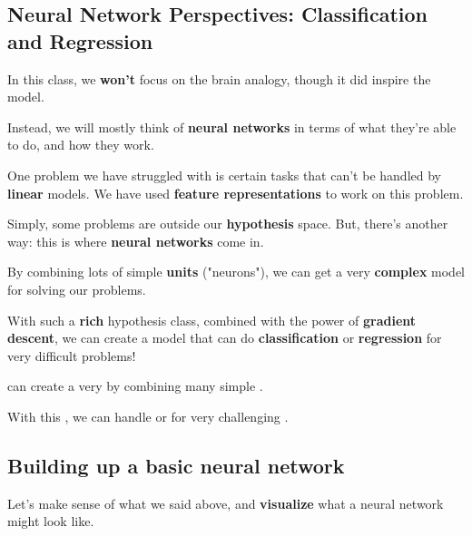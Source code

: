     \subsection*{Neural Network Perspectives: Classification and Regression}
    
        In this class, we \textbf{won't} focus on the brain analogy, though it did inspire the model.
        
        Instead, we will mostly think of \textbf{neural networks} in terms of what they're able to do, and how they work.
        
        One problem we have struggled with is certain tasks that can't be handled by \textbf{linear} models. We have used \textbf{feature representations} to work on this problem.
        
        Simply, some problems are outside our \textbf{hypothesis} space. But, there's another way: this is where \textbf{neural networks} come in.
        
        By combining lots of simple \textbf{units} ("neurons"), we can get a very \textbf{complex} model for solving our problems.
        
        With such a \textbf{rich} hypothesis class, combined with the power of \textbf{gradient descent}, we can create a model that can do \textbf{classification} or \textbf{regression} for very difficult problems!
            \\
            
        \begin{concept}
             can create a very  by combining many simple .
            
            With this , we can handle  or  for very challenging .
        \end{concept}
    
    \subsection*{Building up a basic neural network}
        
        Let's make sense of what we said above, and \textbf{visualize} what a neural network might look like.
        
